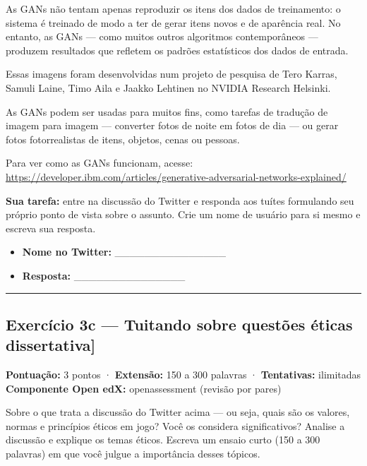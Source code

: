 \documentclass[
  11pt,
]{article}
\providecommand{\tightlist}{%
  \setlength{\itemsep}{0pt}\setlength{\parskip}{0pt}}
\renewcommand{\texttt}[1]{{\color{iaAmeixa}\small\ttfamily #1}}
\begin{document}
As GANs não tentam apenas reproduzir os itens dos dados de treinamento:
o sistema é treinado de modo a ter de gerar itens novos e de aparência
real. No entanto, as GANs --- como muitos outros algoritmos
contemporâneos --- produzem resultados que refletem os padrões
estatísticos dos dados de entrada.

Essas imagens foram desenvolvidas num projeto de pesquisa de Tero
Karras, Samuli Laine, Timo Aila e Jaakko Lehtinen no NVIDIA Research
Helsinki.

As GANs podem ser usadas para muitos fins, como tarefas de tradução de
imagem para imagem --- converter fotos de noite em fotos de dia --- ou
gerar fotos fotorrealistas de itens, objetos, cenas ou pessoas.

Para ver como as GANs funcionam, acesse:
\url{https://developer.ibm.com/articles/generative-adversarial-networks-explained/}

\textbf{Sua tarefa:} entre na discussão do Twitter e responda aos tuítes
formulando seu próprio ponto de vista sobre o assunto. Crie um nome de
usuário para si mesmo e escreva sua resposta.

\begin{itemize}
\tightlist
\item
  \textbf{Nome no Twitter:} \_\_\_\_\_\_\_\_\_\_\_\_\_\_\_
\item
  \textbf{Resposta:} \_\_\_\_\_\_\_\_\_\_\_\_\_\_\_
\end{itemize}

\begin{center}\rule{0.5\linewidth}{0.5pt}\end{center}

\hypertarget{exercuxedcio-3c-tuitando-sobre-questuxf5es-uxe9ticas-dissertativa}{%
\subsection{\texorpdfstring{Exercício 3c --- Tuitando sobre questões
éticas
\texttt{{[}dissertativa{]}}}{Exercício 3c --- Tuitando sobre questões éticas {[}dissertativa{]}}}\label{exercuxedcio-3c-tuitando-sobre-questuxf5es-uxe9ticas-dissertativa}}

\textbf{Pontuação:} 3 pontos · \textbf{Extensão:} 150 a 300 palavras ·
\textbf{Tentativas:} ilimitadas \textbf{Componente Open edX:}
\texttt{openassessment} (revisão por pares)

Sobre o que trata a discussão do Twitter acima --- ou seja, quais são os
valores, normas e princípios éticos em jogo? Você os considera
significativos? Analise a discussão e explique os temas éticos. Escreva
um ensaio curto (150 a 300 palavras) em que você julgue a importância
desses tópicos.
\end{document}
